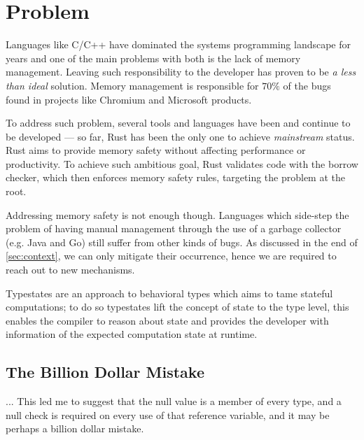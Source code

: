 \section{Problem}\label{sec:problem}

Languages like C/C++ have dominated the systems programming landscape for years and
one of the main problems with both is the lack of memory management.
Leaving such responsibility to the developer has proven to be \emph{a less than ideal} solution.
Memory management is responsible for $70\%$ of the bugs found in projects like Chromium
and Microsoft products.

To address such problem, several tools and languages have been and continue to be developed ---
so far, Rust has been the only one to achieve \emph{mainstream} status.
Rust aims to provide memory safety without affecting performance or productivity.
To achieve such ambitious goal, Rust validates code with the borrow checker, which then enforces memory safety rules,
targeting the problem at the root.

Addressing memory safety is not enough though.
Languages which side-step the problem of having manual management
through the use of a garbage collector (e.g. Java and Go) still suffer from other kinds of bugs.
As discussed in the end of \autoref{sec:context}, we can only mitigate their occurrence,
hence we are required to reach out to new mechanisms.

Typestates are an approach to behavioral types which aims to tame stateful computations;
to do so typestates lift the concept of state to the type level,
this enables the compiler to reason about state and provides the developer
with information of the expected computation state at runtime.

\subsection{The Billion Dollar Mistake}

\begin{displayquote}
    ... This led me to suggest that the null value is a member of every type,
    and a null check is required on every use of that reference variable,
    and it may be perhaps a billion dollar mistake.
\end{displayquote}


